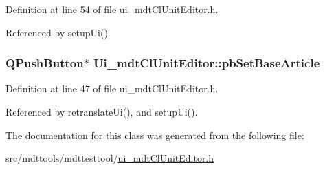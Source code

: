 Definition at line 54 of file ui\-\_\-mdt\-Cl\-Unit\-Editor.\-h.



Referenced by setup\-Ui().

\hypertarget{class_ui__mdt_cl_unit_editor_a3905c3deff100172947ace9120fe8ea7}{
\subsubsection[{pb\-Set\-Base\-Article}]{\setlength{\rightskip}{0pt plus 5cm}Q\-Push\-Button$\ast$ Ui\-\_\-mdt\-Cl\-Unit\-Editor\-::pb\-Set\-Base\-Article}}\label{class_ui__mdt_cl_unit_editor_a3905c3deff100172947ace9120fe8ea7}


Definition at line 47 of file ui\-\_\-mdt\-Cl\-Unit\-Editor.\-h.



Referenced by retranslate\-Ui(), and setup\-Ui().



The documentation for this class was generated from the following file\-:\begin{DoxyCompactItemize}
\item 
src/mdttools/mdttesttool/\hyperlink{ui__mdt_cl_unit_editor_8h}{ui\-\_\-mdt\-Cl\-Unit\-Editor.\-h}\end{DoxyCompactItemize}
